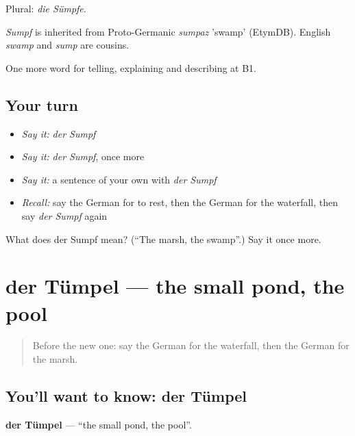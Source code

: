 Plural: \emph{die Sümpfe}.

\begin{cousinweb}
\emph{Sumpf} is inherited from Proto-Germanic \emph{sumpaz} 'swamp' (EtymDB). English \emph{swamp} and \emph{sump} are cousins.
\end{cousinweb}

\begin{grammarlens}[title={What you've built}]
One more word for telling, explaining and describing at B1.
\end{grammarlens}

\subsection*{Your turn}
\begin{itemize}
\raggedright
  \item \emph{Say it:} \emph{der Sumpf}
  \item \emph{Say it:} \emph{der Sumpf}, once more
  \item \emph{Say it:} a sentence of your own with \emph{der Sumpf}
  \item \emph{Recall:} say the German for to rest, then the German for the waterfall, then say \emph{der Sumpf} again
\end{itemize}

\begin{tcolorbox}[breakable,colback=teal!4,colframe=teal!35!black,title={Before you move on}]
What does der Sumpf mean? (\textquotedblleft{}The marsh, the swamp\textquotedblright{}.) Say it once more.
\end{tcolorbox}
\section[der Tümpel]{der Tümpel — the small pond, the pool}

\label{lesson:GE-C455-tuempel}



\begin{quote}
Before the new one: say the German for the waterfall, then the German for the marsh.
\end{quote}

\subsection*{You'll want to know: der Tümpel}
\textbf{der Tümpel} — \textquotedblleft{}the small pond, the pool\textquotedblright{}.

